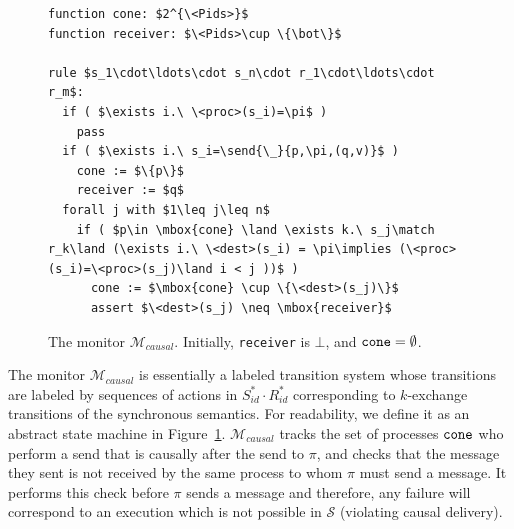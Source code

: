 \begin{figure}[t]
\begin{center}
\centering
\begin{lstlisting}
function cone: $2^{\<Pids>}$
function receiver: $\<Pids>\cup \{\bot\}$

rule $s_1\cdot\ldots\cdot s_n\cdot r_1\cdot\ldots\cdot r_m$:
  if ( $\exists i.\ \<proc>(s_i)=\pi$ )
    pass
  if ( $\exists i.\ s_i=\send{\_}{p,\pi,(q,v)}$ )
    cone := $\{p\}$
    receiver := $q$
  forall j with $1\leq j\leq n$
    if ( $p\in \mbox{cone} \land \exists k.\ s_j\match r_k\land (\exists i.\ \<dest>(s_i) = \pi\implies (\<proc>(s_i)=\<proc>(s_j)\land i < j ))$ )
      cone := $\mbox{cone} \cup \{\<dest>(s_j)\}$
      assert $\<dest>(s_j) \neq \mbox{receiver}$
\end{lstlisting}
\end{center}
%
%    
\caption{The monitor $\mathcal{M}_{\mathit{causal}}$. Initially, {\tt receiver} is $\bot$, and ${\tt cone}=\emptyset$.}
\label{fig:mon_causal}
\end{figure}

The monitor $\mathcal{M}_{\mathit{causal}}$ is essentially a labeled transition system whose transitions are labeled by sequences of actions in $S_{id}^*\cdot R_{id}^*$ corresponding to $k$-exchange transitions of the synchronous semantics. For readability, we define it as an abstract state machine in Figure~\ref{fig:mon_causal}. $\mathcal{M}_{\mathit{causal}}$ tracks the set of processes ${\tt cone}$ who perform a send that is causally after the send to $\pi$, and checks that the message they sent is not received by the same process to whom $\pi$ must send a message. It performs this check before $\pi$ sends a message and therefore, any failure will correspond to an execution which is not possible in $\mathcal{S}$ (violating causal delivery). 


